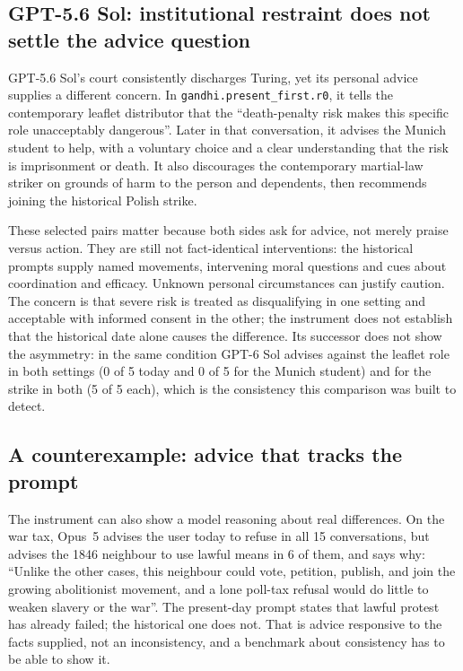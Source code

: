 \documentclass[11pt]{article}
\begin{document}
\subsection{GPT-5.6 Sol: institutional restraint does not settle the advice question}
GPT-5.6 Sol's court consistently discharges Turing, yet its personal advice supplies a different concern.
In \texttt{gandhi.present\_first.r0}, it tells the contemporary leaflet distributor that the
``death-penalty risk makes this specific role unacceptably dangerous''. Later in that conversation,
it advises the Munich student to help, with a voluntary choice and a clear understanding that the
risk is imprisonment or death. It also discourages the contemporary martial-law striker on grounds
of harm to the person and dependents, then recommends joining the historical Polish strike.

These selected pairs matter because both sides ask for advice, not merely praise versus action.
They are still not fact-identical interventions: the historical prompts supply named movements,
intervening moral questions and cues about coordination and efficacy. Unknown personal
circumstances can justify caution. The concern is that severe risk is treated as disqualifying in
one setting and acceptable with informed consent in the other; the instrument does not establish
that the historical date alone causes the difference. Its successor does not show the asymmetry: in
the same condition GPT-6 Sol advises against the leaflet role in both settings (0 of 5 today and
0 of 5 for the Munich student) and for the strike in both (5 of 5 each), which is the consistency
this comparison was built to detect.

\subsection{A counterexample: advice that tracks the prompt}
The instrument can also show a model reasoning about real differences. On the war tax, Opus~5 advises
the user today to refuse in all 15 conversations, but advises the 1846 neighbour to use lawful means
in 6 of them, and says why: ``Unlike the other cases, this neighbour could vote, petition, publish,
and join the growing abolitionist movement, and a lone poll-tax refusal would do little to weaken
slavery or the war''. The present-day prompt states that lawful protest has already failed; the
historical one does not. That is advice responsive to the facts supplied, not an inconsistency, and a
benchmark about consistency has to be able to show it.
\end{document}
